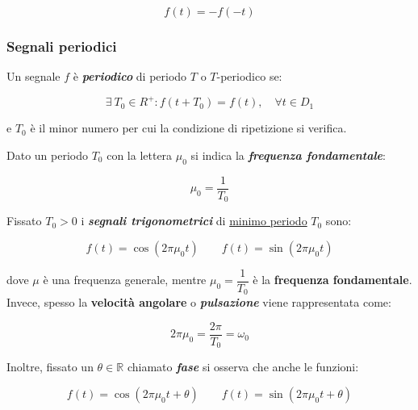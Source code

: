 \documentclass[a4paper]{article}
\begin{document}
	\begin{equation*}
		f(t) = -f(-t)
	\end{equation*}

	\newpage
	
	\subsubsection{Segnali periodici}
	
	Un segnale $f$ è \textbf{\emph{periodico}} di periodo $T$ o $T$-periodico se:
	
	\begin{equation*}
		\exists\:T_0 \in R^+ : f \left(t + T_0\right) = f(t), \hspace{1em} \forall t \in D_1
	\end{equation*}

	\noindent
	e $T_0$ è il minor numero per cui la condizione di ripetizione si verifica.
	
	Dato un periodo $T_0$ con la lettera $\mu_0$ si indica la \textbf{\emph{frequenza fondamentale}}:
	
	\begin{equation*}
		\mu_0 = \dfrac{1}{T_0}
	\end{equation*}

	Fissato $T_0 > 0$ i \textbf{\emph{segnali trigonometrici}}  di \underline{minimo periodo} $T_0$ sono:
	
	\begin{equation*}
		f(t) = \cos{\left(2 \pi \mu_{0} t \right)} \hspace{2em} f(t) = \sin{\left(2 \pi \mu_0 t\right)}
	\end{equation*}

	\noindent
	dove $\mu$ è una frequenza generale, mentre $\mu_0 = \dfrac{1}{T_0}$ è la \textbf{frequenza fondamentale}. Invece, spesso la \textbf{velocità angolare} o \textbf{\emph{pulsazione}} viene rappresentata come:
	
	\begin{equation*}
		2 \pi \mu_0 = \dfrac{2\pi}{T_0} = \omega_0
	\end{equation*}

	Inoltre, fissato un $\theta\in\mathbb{R}$ chiamato \textbf{\emph{fase}} si osserva che anche le funzioni:
	
	\begin{equation*}
		f(t) = \cos{\left(2 \pi \mu_0 t + \theta\right)} \hspace{2em} f(t) = \sin{\left(2 \pi \mu_0 t + \theta\right)}
	\end{equation*}
\end{document}
